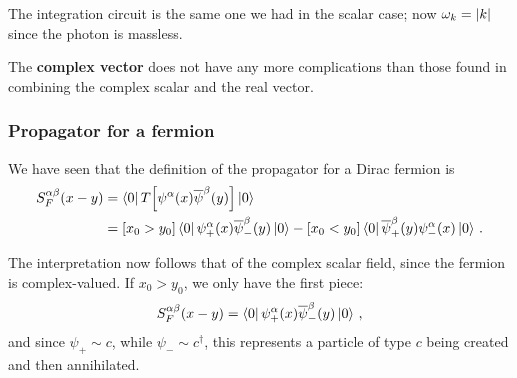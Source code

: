 \documentclass[main.tex]{subfiles}
\begin{document}
The integration circuit is the same one we had in the scalar case; now \(\omega_{k} = \abs{k}\) since the photon is massless.

The \textbf{complex vector} does not have any more complications than those found in combining the complex scalar and the real vector.

\subsubsection{Propagator for a fermion}

We have seen that the definition of the propagator for a Dirac fermion is 
%
\begin{align}
S^{\alpha \beta }_{F}(x-y) 
&= \bra{0} T \qty[ \psi^{\alpha } (x) \overline{\psi}^{\beta }(y)] \ket{0}  \\
&= [x_0 > y_0 ]
\bra{0} \psi_{+}^{\alpha }(x) \overline{\psi}_{-}^{\beta } (y)\ket{0}
- [x_0 < y_0 ]
\bra{0} \overline{\psi}^{\beta }_{+}(y) \psi^{\alpha }_{-}(x) \ket{0}
\,.
\end{align}

The interpretation now follows that of the complex scalar field, since the fermion is complex-valued. 
If \(x_0 > y_0 \), we only have the first piece: 
%
\begin{align}
S^{\alpha \beta }_{F} (x-y) = \bra{0} \psi_{+}^{\alpha }(x) \overline{\psi}_{-}^{\beta } (y)\ket{0}
\,,
\end{align}
%
and since \(\psi_{+} \sim c\), while \(\psi_{-} \sim c ^\dag\), this represents a particle of type \(c\) being created and then annihilated.
\end{document}
